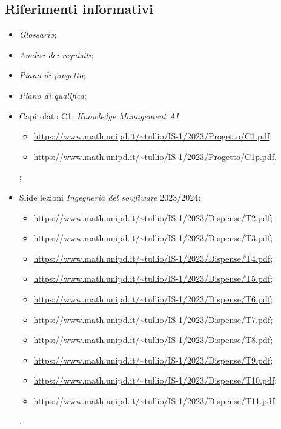 \documentclass[10pt, a4paper]{article}
\begin{document}
    \subsection{Riferimenti informativi}
    \begin{itemize}
        \item \textit{Glossario};
        \item \textit{Analisi dei requisiti};
        \item \textit{Piano di progetto};
        \item \textit{Piano di qualifica};
        \item Capitolato C1: \textit{Knowledge Management AI}\\
            \begin{itemize}
                \item \url{https://www.math.unipd.it/~tullio/IS-1/2023/Progetto/C1.pdf};
                \item \url{https://www.math.unipd.it/~tullio/IS-1/2023/Progetto/C1p.pdf}.
            \end{itemize};
        \item Slide lezioni \textit{Ingegneria del sowftware} 2023/2024:
            \begin{itemize}
                \item \url{https://www.math.unipd.it/~tullio/IS-1/2023/Dispense/T2.pdf};
                \item \url{https://www.math.unipd.it/~tullio/IS-1/2023/Dispense/T3.pdf};
                \item \url{https://www.math.unipd.it/~tullio/IS-1/2023/Dispense/T4.pdf};
                \item \url{https://www.math.unipd.it/~tullio/IS-1/2023/Dispense/T5.pdf};
                \item \url{https://www.math.unipd.it/~tullio/IS-1/2023/Dispense/T6.pdf};
                \item \url{https://www.math.unipd.it/~tullio/IS-1/2023/Dispense/T7.pdf};
                \item \url{https://www.math.unipd.it/~tullio/IS-1/2023/Dispense/T8.pdf};
                \item \url{https://www.math.unipd.it/~tullio/IS-1/2023/Dispense/T9.pdf};
                \item \url{https://www.math.unipd.it/~tullio/IS-1/2023/Dispense/T10.pdf};
                \item \url{https://www.math.unipd.it/~tullio/IS-1/2023/Dispense/T11.pdf}.
            \end{itemize}.
    \end{itemize}
\end{document}
